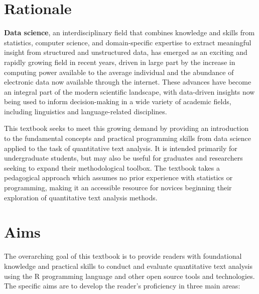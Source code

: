 \documentclass[
  letterpaper,
  krantz1]{latex/krantz-mod}
\theoremstyle{definition}
\theoremstyle{definition}
\theoremstyle{remark}
\begin{document}
\section*{Rationale}\label{sec-preface-rationale}


\textbf{Data science}, an interdisciplinary field
that combines knowledge and skills from statistics, computer science,
and domain-specific expertise to extract meaningful insight from
structured and unstructured data, has emerged as an exciting and rapidly
growing field in recent years, driven in large part by the increase in
computing power available to the average individual and the abundance of
electronic data now available through the internet. These advances have
become an integral part of the modern scientific landscape, with
data-driven insights now being used to inform decision-making in a wide
variety of academic fields, including linguistics and language-related
disciplines.

This textbook seeks to meet this growing demand by providing an
introduction to the fundamental concepts and practical programming
skills from data science applied to the task of quantitative text
analysis. It is intended primarily for undergraduate students, but may
also be useful for graduates and researchers seeking to expand their
methodological toolbox. The textbook takes a pedagogical approach which
assumes no prior experience with statistics or programming, making it an
accessible resource for novices beginning their exploration of
quantitative text analysis methods.

\section*{Aims}\label{sec-preface-aims}


The overarching goal of this textbook is to provide readers with
foundational knowledge and practical skills to conduct and evaluate
quantitative text analysis using the R programming language and other
open source tools and technologies. The specific aims are to develop the
reader's proficiency in three main areas:
\end{document}
